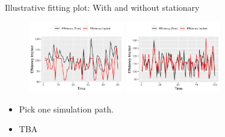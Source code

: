 \documentclass[aspectratio=169]{beamer}
\begin{document}
\begin{frame}{Illustrative fitting plot: With and without stationary}
\begin{figure}[!ht]
  \begin{center}

  \includegraphics[width = 0.37\textwidth]
  {figuretable/illustrative_plot_implied_efficiency_num_time_50_cobb_douglas_0.3_AR1_I0.png}
  \includegraphics[width = 0.37\textwidth]
  {figuretable/illustrative_plot_implied_efficiency_num_time_100_cobb_douglas_0.3_AR1_I0.png}
  \end{center}
  \footnotesize
\end{figure} 
\begin{itemize}
    \item Pick one simulation path.
    \item TBA
\end{itemize}
\end{frame}
\end{document}
